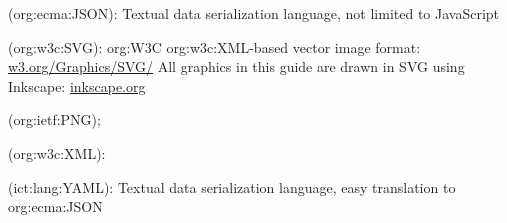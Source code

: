 \begin{description}[font=\normalfont,itemsep=0pt]
    \item[\acs{org:ecma:JSON}]
        (\acl{org:ecma:JSON}):
            Textual data serialization language, not limited to JavaScript

    \item[\acs{org:w3c:SVG}]
        (\acl{org:w3c:SVG}):
            \acs{org:W3C} \acs{org:w3c:XML}-based vector image format: \href{https://www.w3.org/Graphics/SVG/}{w3.org/Graphics/SVG/}
            All graphics in this guide are drawn in SVG using Inkscape: \href{https://inkscape.org/}{inkscape.org}

    \item[\acs{org:ietf:PNG}]
        (\acl{org:ietf:PNG});

    \item[\acs{org:w3c:XML}]
        (\acl{org:w3c:XML}):

    \item[\acs{ict:lang:YAML}]
        (\acl{ict:lang:YAML}):
            Textual data serialization language, easy translation to \acs{org:ecma:JSON}

\end{description}